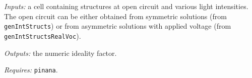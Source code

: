 			\textit{Inputs:} a cell containing structures at open circuit and various
	     light intensities. The open circuit can be either obtained from
	     symmetric solutions (from \texttt{gen\-Int\-Structs}) or from asymmetric solutions
	     with applied voltage (from \texttt{gen\-Int\-Structs\-Real\-Voc}).
	
	\textit{Outputs:} the numeric ideality factor.
	
	\textit{Requires:} \texttt{pinana}.
	
	

